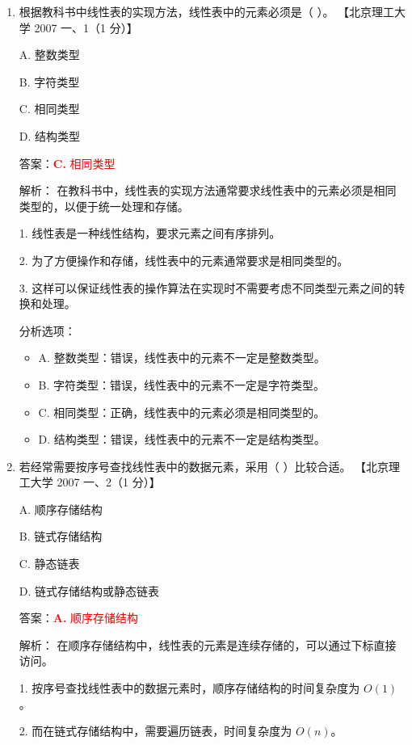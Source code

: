 \documentclass[lang=cn,newtx,10pt,scheme=chinese]{../../../elegantbook}
\begin{document}
\begin{enumerate}
        \item 根据教科书中线性表的实现方法，线性表中的元素必须是（ ）。  
        【北京理工大学 2007 一、1（1 分）】  
    
        A. 整数类型  
    
        B. 字符类型  
    
        C. 相同类型  
    
        D. 结构类型  
        
        答案：\textcolor{red}{\textbf{C.} 相同类型}
        
        解析：
        在教科书中，线性表的实现方法通常要求线性表中的元素必须是相同类型的，以便于统一处理和存储。

        1. 线性表是一种线性结构，要求元素之间有序排列。

        2. 为了方便操作和存储，线性表中的元素通常要求是相同类型的。

        3. 这样可以保证线性表的操作算法在实现时不需要考虑不同类型元素之间的转换和处理。

        分析选项：
        \begin{itemize}
            \item A. 整数类型：错误，线性表中的元素不一定是整数类型。
            \item B. 字符类型：错误，线性表中的元素不一定是字符类型。
            \item C. 相同类型：正确，线性表中的元素必须是相同类型的。
            \item D. 结构类型：错误，线性表中的元素不一定是结构类型。
        \end{itemize}
        \item 若经常需要按序号查找线性表中的数据元素，采用（ ）比较合适。  
        【北京理工大学 2007 一、2（1 分）】  
    
        A. 顺序存储结构  
    
        B. 链式存储结构  
    
        C. 静态链表  
    
        D. 链式存储结构或静态链表  

        答案：\textcolor{red}{\textbf{A.} 顺序存储结构}

        解析：
        在顺序存储结构中，线性表的元素是连续存储的，可以通过下标直接访问。

        1. 按序号查找线性表中的数据元素时，顺序存储结构的时间复杂度为 $O(1)$。

        2. 而在链式存储结构中，需要遍历链表，时间复杂度为 $O(n)$。


\end{enumerate}
\end{document}
